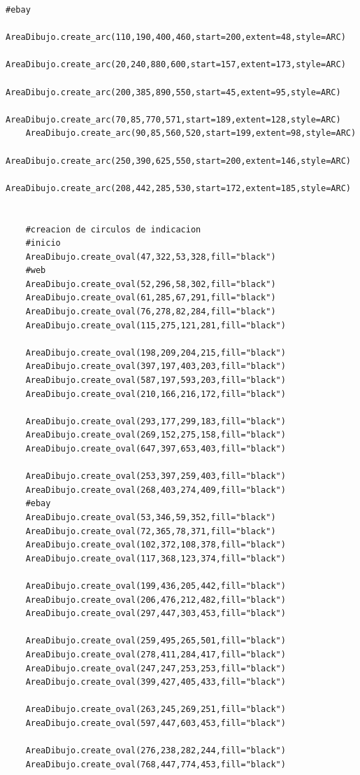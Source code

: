 \begin{lstlisting}[frame=single]
    #ebay
    AreaDibujo.create_arc(110,190,400,460,start=200,extent=48,style=ARC)
    AreaDibujo.create_arc(20,240,880,600,start=157,extent=173,style=ARC)
    AreaDibujo.create_arc(200,385,890,550,start=45,extent=95,style=ARC)
    AreaDibujo.create_arc(70,85,770,571,start=189,extent=128,style=ARC)
    AreaDibujo.create_arc(90,85,560,520,start=199,extent=98,style=ARC)
    AreaDibujo.create_arc(250,390,625,550,start=200,extent=146,style=ARC)
    AreaDibujo.create_arc(208,442,285,530,start=172,extent=185,style=ARC)


    #creacion de circulos de indicacion
    #inicio
    AreaDibujo.create_oval(47,322,53,328,fill="black")
    #web
    AreaDibujo.create_oval(52,296,58,302,fill="black")
    AreaDibujo.create_oval(61,285,67,291,fill="black")
    AreaDibujo.create_oval(76,278,82,284,fill="black")
    AreaDibujo.create_oval(115,275,121,281,fill="black")

    AreaDibujo.create_oval(198,209,204,215,fill="black")
    AreaDibujo.create_oval(397,197,403,203,fill="black")
    AreaDibujo.create_oval(587,197,593,203,fill="black")
    AreaDibujo.create_oval(210,166,216,172,fill="black")

    AreaDibujo.create_oval(293,177,299,183,fill="black")
    AreaDibujo.create_oval(269,152,275,158,fill="black")
    AreaDibujo.create_oval(647,397,653,403,fill="black")

    AreaDibujo.create_oval(253,397,259,403,fill="black")
    AreaDibujo.create_oval(268,403,274,409,fill="black")
    #ebay
    AreaDibujo.create_oval(53,346,59,352,fill="black")
    AreaDibujo.create_oval(72,365,78,371,fill="black")
    AreaDibujo.create_oval(102,372,108,378,fill="black")
    AreaDibujo.create_oval(117,368,123,374,fill="black")

    AreaDibujo.create_oval(199,436,205,442,fill="black")
    AreaDibujo.create_oval(206,476,212,482,fill="black")
    AreaDibujo.create_oval(297,447,303,453,fill="black")

    AreaDibujo.create_oval(259,495,265,501,fill="black")
    AreaDibujo.create_oval(278,411,284,417,fill="black")
    AreaDibujo.create_oval(247,247,253,253,fill="black")
    AreaDibujo.create_oval(399,427,405,433,fill="black")

    AreaDibujo.create_oval(263,245,269,251,fill="black")
    AreaDibujo.create_oval(597,447,603,453,fill="black")

    AreaDibujo.create_oval(276,238,282,244,fill="black")
    AreaDibujo.create_oval(768,447,774,453,fill="black")


\end{lstlisting}
